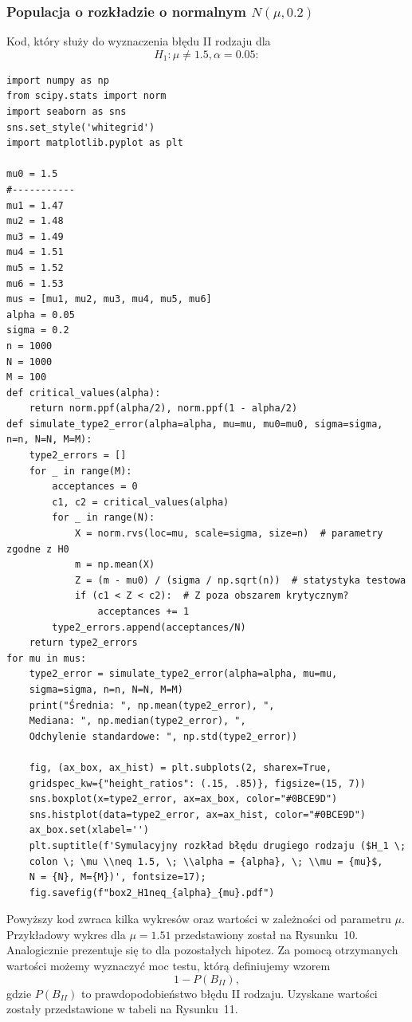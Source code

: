 \documentclass{article}
\begin{document}
\subsubsection{Populacja o rozkładzie o normalnym $N(\mu, 0.2)$}
Kod, który służy do wyznaczenia błędu II rodzaju dla
$$H_1: \mu \neq 1.5, \alpha = 0.05:$$
\begin{verbatim}
import numpy as np
from scipy.stats import norm
import seaborn as sns
sns.set_style('whitegrid')
import matplotlib.pyplot as plt

mu0 = 1.5
#-----------
mu1 = 1.47
mu2 = 1.48
mu3 = 1.49
mu4 = 1.51
mu5 = 1.52
mu6 = 1.53
mus = [mu1, mu2, mu3, mu4, mu5, mu6]
alpha = 0.05
sigma = 0.2
n = 1000
N = 1000
M = 100
def critical_values(alpha):
    return norm.ppf(alpha/2), norm.ppf(1 - alpha/2)
def simulate_type2_error(alpha=alpha, mu=mu, mu0=mu0, sigma=sigma, 
n=n, N=N, M=M):
    type2_errors = []
    for _ in range(M):
        acceptances = 0
        c1, c2 = critical_values(alpha)
        for _ in range(N):
            X = norm.rvs(loc=mu, scale=sigma, size=n)  # parametry zgodne z H0
            m = np.mean(X)
            Z = (m - mu0) / (sigma / np.sqrt(n))  # statystyka testowa
            if (c1 < Z < c2):  # Z poza obszarem krytycznym?
                acceptances += 1
        type2_errors.append(acceptances/N)
    return type2_errors
for mu in mus:
    type2_error = simulate_type2_error(alpha=alpha, mu=mu, 
    sigma=sigma, n=n, N=N, M=M)
    print("Średnia: ", np.mean(type2_error), ",
    Mediana: ", np.median(type2_error), ",
    Odchylenie standardowe: ", np.std(type2_error))

    fig, (ax_box, ax_hist) = plt.subplots(2, sharex=True,
    gridspec_kw={"height_ratios": (.15, .85)}, figsize=(15, 7))
    sns.boxplot(x=type2_error, ax=ax_box, color="#0BCE9D")
    sns.histplot(data=type2_error, ax=ax_hist, color="#0BCE9D")
    ax_box.set(xlabel='')
    plt.suptitle(f'Symulacyjny rozkład błędu drugiego rodzaju ($H_1 \;
    colon \; \mu \\neq 1.5, \; \\alpha = {alpha}, \; \\mu = {mu}$,
    N = {N}, M={M})', fontsize=17);
    fig.savefig(f"box2_H1neq_{alpha}_{mu}.pdf")
\end{verbatim}
Powyższy kod zwraca kilka wykresów oraz wartości w zależności od parametru $\mu$. Przykładowy wykres dla $\mu = 1.51$ przedstawiony został na Rysunku~10. Analogicznie prezentuje się to dla pozostałych hipotez. Za pomocą otrzymanych wartości możemy wyznaczyć moc testu, którą definiujemy wzorem $$1 - P(B_{II}),$$ gdzie $P(B_{II})$ to prawdopodobieństwo błędu II rodzaju. Uzyskane wartości zostały przedstawione w tabeli na Rysunku~11.
\end{document}
